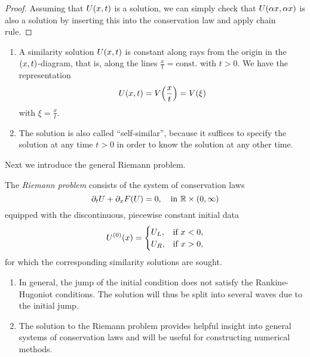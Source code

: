 \begin{proof}
	Assuming that \(U\parentheses*{x, t}\) is a solution, we can simply check that \(U\parentheses*{\alpha x, \alpha x}\) is also a solution by inserting this into the conservation law and apply chain rule.
\end{proof}

\begin{remark}
	\begin{enumerate}
		\item A similarity solution \(U\parentheses*{x, t}\) is constant along rays from the origin in the \(\parentheses*{x, t}\)-diagram, that is, along the lines \(\frac{x}{t} = \text{const.}\) with \(t > 0\).
		We have the representation
		\[
			U\parentheses*{x, t} = V\parentheses*{\frac{x}{t}} = V\parentheses*{\xi}
		\]
		with \(\xi = \frac{x}{t}\).
		\item The solution is also called ``self-similar'', because it suffices to specify the solution at any time \(t > 0\) in order to know the solution at any other time.
	\end{enumerate}
\end{remark}

Next we introduce the general Riemann problem.

\begin{definition}
	The \emph{Riemann problem} consists of the system of conservation laws
	\[
		\partial_t U + \partial_x F\parentheses*{U} = 0, \quad \text{in }\R \times \parentheses*{0, \infty}
	\]
	equipped with the discontinuous, piecewise constant initial data
	\[
		U^{\parentheses*{0}}\parentheses*{x} = \begin{cases}
			U_L, & \text{if }x < 0,\\
			U_R, & \text{if }x > 0,
		\end{cases}
	\]
	for which the corresponding similarity solutions are sought.
\end{definition}

\begin{remark}
	\begin{enumerate}
		\item In general, the jump of the initial condition does not satisfy the Rankine-Hugoniot conditions.
		The solution will thus be split into several waves due to the initial jump.
		\item The solution to the Riemann problem provides helpful insight into general systems of conservation laws and will be useful for constructing numerical methods.
	\end{enumerate}
\end{remark}


